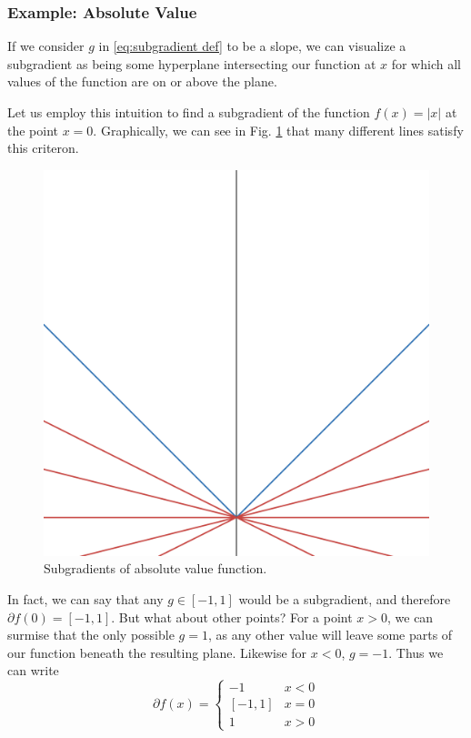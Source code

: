 \documentclass[conference]{IEEEtran}
\begin{document}
\subsubsection{Example: Absolute Value}
If we consider \(g\) in \eqref{eq:subgradient def} to be a slope, we can visualize a subgradient as being some hyperplane intersecting our function at \(x\) for which all values of the function are on or above the plane. 

Let us employ this intuition to find a subgradient of the function \(f(x) = |x|\) at the point \(x=0\). Graphically, we can see in Fig. \ref{fig:abs subgradients} that many different lines satisfy this criteron.
\begin{figure}[tbp]
    \centering
    \includegraphics[width=0.9\linewidth]{Figures/abs_subgradients.png}
    \caption{Subgradients of absolute value function.}
    \label{fig:abs subgradients}
\end{figure}
In fact, we can say that any \(g \in [-1,1]\) would be a subgradient, and therefore \(\partial f(0) = [-1,1]\). But what about other points? For a point \(x > 0\), we can surmise that the only possible \(g = 1\), as any other value will leave some parts of our function beneath the resulting plane. Likewise for \(x < 0\), \(g = -1\). Thus we can write
\begin{equation}\label{eq:abs subdifferential}
\partial f(x) = \begin{cases}
    -1 & x < 0 \\
    [-1, 1] & x = 0\\
    1 & x > 0
\end{cases}
\end{equation}
\end{document}
